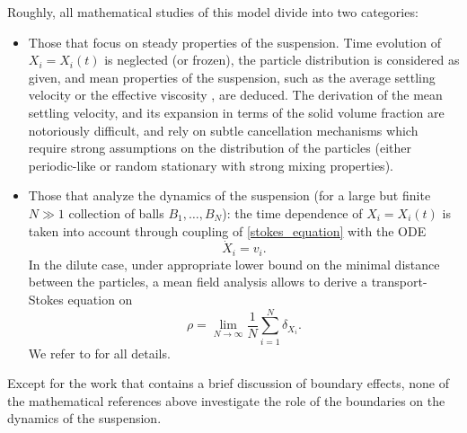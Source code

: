 \documentclass[10pt]{amsart}
\theoremstyle{plain}
\theoremstyle{definition}
\begin{document}
Roughly, all mathematical studies of this model divide into two categories:
\begin{itemize}
\item Those that focus on steady properties of the suspension. Time evolution of $X_i = X_i(t)$ is neglected (or frozen), the particle distribution is considered as given, and mean properties of the suspension, such as the average settling velocity \cite{HillairetHoefer23, Hasimoto59, Batchelor72Sedimentation, DuerinckxGloria22} or the effective viscosity \cite{HainesMazzucato12,NiethammerSchubert19, Gerard-Varet19, Gerard-VaretHillairet19, Gerard-VaretHoefer21, Gerard-VaretMecherbet20,DuerinckxGloria19}, are deduced. The derivation of the mean settling velocity, and its expansion in terms of the solid volume fraction are notoriously difficult, and rely on subtle cancellation mechanisms which require strong assumptions on the distribution of the particles (either periodic-like or random stationary with strong mixing properties).
\item Those that analyze the dynamics of the suspension (for a large but finite $N \gg 1$ collection of balls $B_1, \dots, B_N$): the time dependence of $X_i = X_i(t)$ is taken into account through coupling of \eqref{stokes_equation} with the ODE
\begin{equation}
\dot{X}_i = v_i.
\end{equation}
In the dilute case, under appropriate lower bound on the minimal distance between the particles, a mean field analysis allows to derive a transport-Stokes equation on
\[
\rho = \lim_{N\rightarrow \infty} \frac{1}{N} \sum_{i=1}^N \delta_{X_i}.
\]
We refer to \cite{Hofer18MeanField,Mecherbet19,Hofer&Schubert,HoferSchubert23} for all details.
\end{itemize}

Except for the work \cite{HillairetHoefer23} that contains a brief discussion of boundary effects, none of the mathematical references above investigate the role of the boundaries on the dynamics of the suspension.
\end{document}
